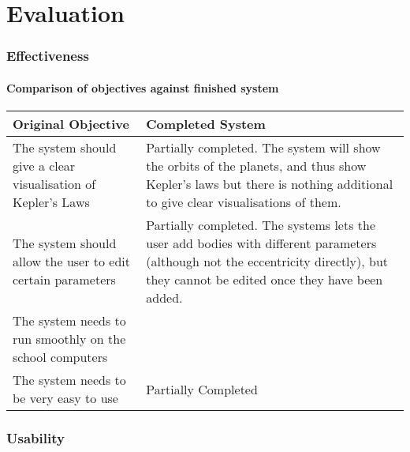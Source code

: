 \part{Evaluation}

%
%
%
%

\section{Effectiveness}
\subsection{Comparison of objectives against finished system}
\begin{tabular}{p{}p{}}
	Original Objective & Completed System \\\hline
	The system should give a clear visualisation of Kepler's Laws &
	Partially completed. The system will show the orbits of the planets, and
	thus show Kepler's laws but there is nothing additional to give clear
	visualisations of them.\\
	The system should allow the user to edit certain parameters & Partially
	completed. The systems lets the user add bodies with different
	parameters (although not the eccentricity directly), but they cannot be
	edited once they have been added. \\
	The system needs to run smoothly on the school computers & \\
	The system needs to be very easy to use & Partially Completed\\
\end{tabular}

\section{Usability}
%
